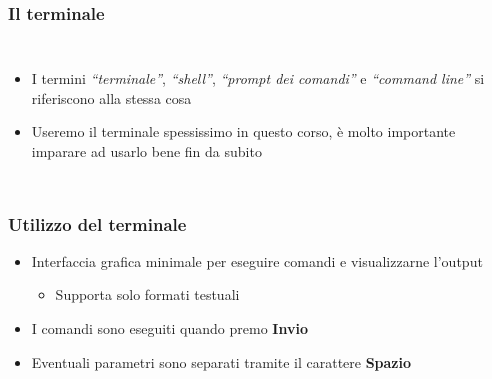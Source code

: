 \label{sec:intro}

\begin{contentframe}
    \frametitle{Il terminale}

    \begin{columns}
        \begin{itemize}
            \item I termini \textit{``terminale''}, \textit{``shell''}, \textit{``prompt dei comandi''} e \textit{``command line''} si riferiscono alla stessa cosa

            \bigskip
            \item Useremo il terminale spessissimo in questo corso, è molto importante imparare ad usarlo bene fin da subito
        \end{itemize}

        \centering
    \end{columns}
\end{contentframe}

\begin{contentframe}
    \frametitle{Utilizzo del terminale}

    \begin{itemize}
        \item Interfaccia grafica minimale per eseguire comandi e visualizzarne l'output
        \begin{itemize}
            \item Supporta solo formati testuali
        \end{itemize}

        \bigskip
        \item I comandi sono eseguiti quando premo \textbf{Invio}
        \item Eventuali parametri sono separati tramite il carattere \textbf{Spazio}
    \end{itemize}
\end{contentframe}

